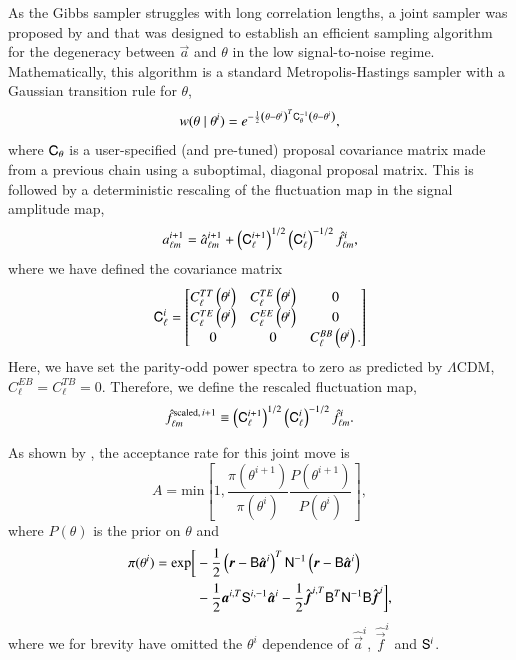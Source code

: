 \documentclass[twocolumn]{../common/aa}
\newcommand{\B}[0]{\tens{B}}
\renewcommand{\C}[0]{\tens{C}}
\renewcommand{\a}[0]{\vec{a}}
\newcommand{\f}[0]{\vec{f}}
\newcommand{\N}[0]{\tens{N}}
\renewcommand{\S}[0]{\tens{S}}
\renewcommand{\r}[0]{\vec{r}}
\begin{document}
As the Gibbs sampler struggles with long correlation lengths, a joint sampler was proposed by \citet{jewell:2009} and \citet{racine:2016} that was designed to establish an efficient sampling algorithm for the degeneracy between $\a$ and $\theta$ in the low signal-to-noise regime. Mathematically, this algorithm is a standard Metropolis-Hastings sampler with a Gaussian transition rule for $\theta$,
\begin{equation}
w(\theta \mid\theta^i) = e^{-\frac12 \left(\theta - \theta^i \right)^T \C_{\theta}^{-1}\left(\theta - \theta^i \right)},
\end{equation}
where $\C_{\theta}$ is a user-specified (and pre-tuned) proposal covariance matrix made from a previous chain using a suboptimal, diagonal proposal matrix. This is followed by a deterministic rescaling of the fluctuation map in the signal amplitude map,
\begin{equation}
    a_{\ell m}^{i+1} = \hat{a}_{\ell m}^{i+1} + \left(\C^{i+1}_{\ell}\right)^{1/2}\left(\C^{i}_{\ell}\right)^{-1/2} \hat{f}_{\ell m}^{i},
\end{equation}
where we have defined the covariance matrix
\begin{equation}
  \C^i_\ell = \begin{bmatrix}
    C^{TT}_{\ell}\left(\theta^i\right) & C^{TE}_\ell\left(\theta^i\right) & 0\\
    C^{TE}_{\ell}\left(\theta^i\right) & C^{EE}_\ell\left(\theta^i\right) & 0\\
    0 & 0 & C^{BB}_\ell\left(\theta^i\right).
  \end{bmatrix}
\end{equation}
Here, we have set the parity-odd power spectra to zero as predicted by $\Lambda$CDM, $C^{EB}_\ell = C^{TB}_\ell = 0$. Therefore, we define the rescaled fluctuation map,
\begin{equation}
  \hat{f}_{\ell m}^{\textrm{scaled},\, i+1} \equiv \left(\C^{i+1}_{\ell}\right)^{1/2}\left(\C^{i}_{\ell}\right)^{-1/2} \hat{f}_{\ell m}^{i}.
\end{equation}

As shown by \citet{racine:2016}, the acceptance rate for this joint move is
\begin{equation}
    \label{eq:acceptance-rate}
    A = \mathrm{min}\left[1, \frac{\pi(\theta^{i+1})}{\pi(\theta^i)} \frac{P(\theta^{i+1})}{P(\theta^i)} \right],
\end{equation}
where $P(\theta)$ is the prior on $\theta$ and
\begin{align}
    \nonumber
    \pi(\theta^{i}) = \mathrm{exp}\bigg[&-\frac12 \left(\r-\B\hat{\a}^i\right)^T \N^{-1}\left(\r-\B\hat{\a}^i\right)\\
    &-\frac12\a^{i,T} \S^{i, -1}\hat{\a}^i -\frac12 \hat{\f}^{i, T}\B^T\N^{-1} \B\hat{\f}^i\bigg],
\end{align}
where we for brevity have omitted the $\theta^i$ dependence of $\hat{\a}^i$, $\hat{\f}^i$ and $\S^i$. 
\end{document}
